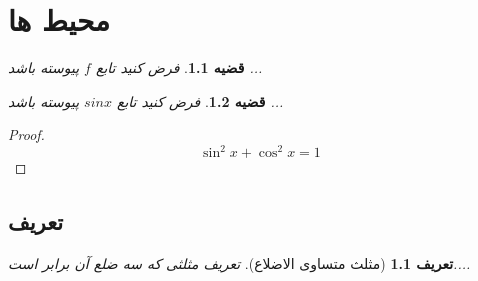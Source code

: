 \documentclass{book}
\newtheorem{thm}{قضیه}[chapter]
\newtheorem{Def}{تعریف}[section]
\begin{document}
\chapter{محیط ها}
\BNaz
\begin{thm}
	فرض کنید تابع $f$ پیوسته باشد ...
\end{thm}

\begin{thm}
	فرض کنید تابع $sin x$ پیوسته باشد ...
\end{thm}

\begin{proof}
	\[
	\sin ^ 2 x + \cos ^2 x = 1
	\]
\end{proof}

\section{تعریف}
\begin{Def}[مثلث متساوی الاضلاع]
تعریف مثلثی که سه ضلع آن برابر است....
\end{Def}
\end{document}
